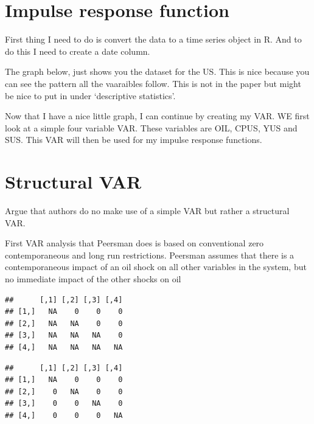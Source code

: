 \documentclass[11pt,preprint, authoryear]{elsarticle}
\numberwithin{equation}{section}
\numberwithin{figure}{section}
\numberwithin{table}{section}
\begin{document}
\hypertarget{impulse-response-function}{%
\section{Impulse response function}\label{impulse-response-function}}

First thing I need to do is convert the data to a time series object in
R. And to do this I need to create a date column.

The graph below, just shows you the dataset for the US. This is nice
because you can see the pattern all the vaaraibles follow. This is not
in the paper but might be nice to put in under `descriptive statistics'.

Now that I have a nice little graph, I can continue by creating my VAR.
WE first look at a simple four variable VAR. These variables are OIL,
CPUS, YUS and SUS. This VAR will then be used for my impulse response
functions.

\hypertarget{structural-var}{%
\section{Structural VAR}\label{structural-var}}

Argue that authors do no make use of a simple VAR but rather a
structural VAR.

First VAR analysis that Peersman does is based on conventional zero
contemporaneous and long run restrictions. Peersman assumes that there
is a contemporaneous impact of an oil shock on all other variables in
the system, but no immediate impact of the other shocks on oil

\begin{verbatim}
##      [,1] [,2] [,3] [,4]
## [1,]   NA    0    0    0
## [2,]   NA   NA    0    0
## [3,]   NA   NA   NA    0
## [4,]   NA   NA   NA   NA
\end{verbatim}

\begin{verbatim}
##      [,1] [,2] [,3] [,4]
## [1,]   NA    0    0    0
## [2,]    0   NA    0    0
## [3,]    0    0   NA    0
## [4,]    0    0    0   NA
\end{verbatim}
\end{document}

